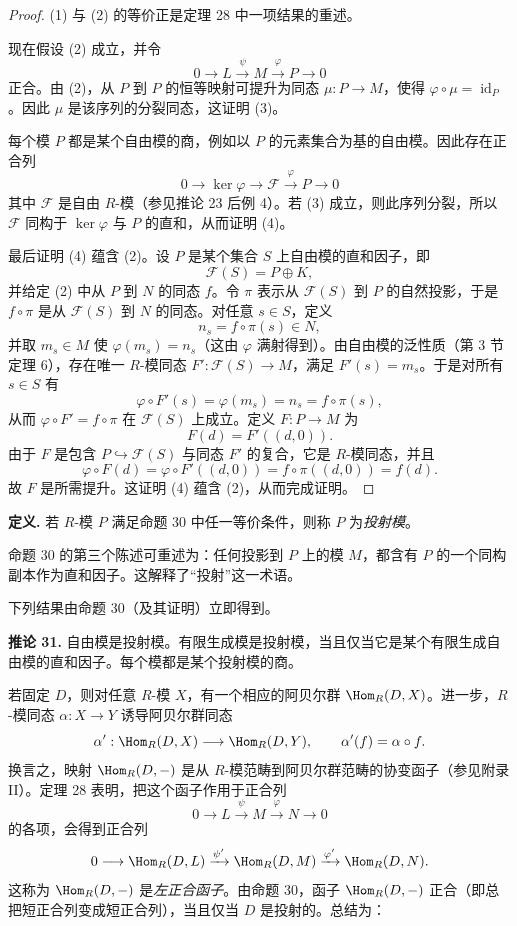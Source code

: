 \begin{proof}
(1) 与 (2) 的等价正是定理 28 中一项结果的重述。

现在假设 (2) 成立，并令
\[
0\longrightarrow L\xrightarrow{\psi}M\xrightarrow{\varphi}P\longrightarrow0
\]
正合。由 (2)，从 $P$ 到 $P$ 的恒等映射可提升为同态 $\mu:P\to M$，使得 $\varphi\circ\mu=\operatorname{id}_P$。因此 $\mu$ 是该序列的分裂同态，这证明 (3)。

每个模 $P$ 都是某个自由模的商，例如以 $P$ 的元素集合为基的自由模。因此存在正合列
\[
0\longrightarrow\ker\varphi\longrightarrow \mathcal F\xrightarrow{\varphi}P\longrightarrow0
\]
其中 $\mathcal F$ 是自由 $R$-模（参见推论 23 后例 4）。若 (3) 成立，则此序列分裂，所以 $\mathcal F$ 同构于 $\ker\varphi$ 与 $P$ 的直和，从而证明 (4)。

最后证明 (4) 蕴含 (2)。设 $P$ 是某个集合 $S$ 上自由模的直和因子，即
\[
\mathcal F(S)=P\oplus K,
\]
并给定 (2) 中从 $P$ 到 $N$ 的同态 $f$。令 $\pi$ 表示从 $\mathcal F(S)$ 到 $P$ 的自然投影，于是 $f\circ\pi$ 是从 $\mathcal F(S)$ 到 $N$ 的同态。对任意 $s\in S$，定义
\[
n_s=f\circ\pi(s)\in N,
\]
并取 $m_s\in M$ 使 $\varphi(m_s)=n_s$（这由 $\varphi$ 满射得到）。由自由模的泛性质（第 3 节定理 6），存在唯一 $R$-模同态 $F':\mathcal F(S)\to M$，满足 $F'(s)=m_s$。于是对所有 $s\in S$ 有
\[
\varphi\circ F'(s)=\varphi(m_s)=n_s=f\circ\pi(s),
\]
从而 $\varphi\circ F'=f\circ\pi$ 在 $\mathcal F(S)$ 上成立。定义 $F:P\to M$ 为
\[
F(d)=F'((d,0)).
\]
由于 $F$ 是包含 $P\hookrightarrow\mathcal F(S)$ 与同态 $F'$ 的复合，它是 $R$-模同态，并且
\[
\varphi\circ F(d)=\varphi\circ F'((d,0))=f\circ\pi((d,0))=f(d).
\]
故 $F$ 是所需提升。这证明 (4) 蕴含 (2)，从而完成证明。
\end{proof}

\noindent\textbf{定义.} 若 $R$-模 $P$ 满足命题 30 中任一等价条件，则称 $P$ 为\emph{投射模}。

命题 30 的第三个陈述可重述为：任何投影到 $P$ 上的模 $M$，都含有 $P$ 的一个同构副本作为直和因子。这解释了“投射”这一术语。

下列结果由命题 30（及其证明）立即得到。

\noindent\textbf{推论 31.} 自由模是投射模。有限生成模是投射模，当且仅当它是某个有限生成自由模的直和因子。每个模都是某个投射模的商。

若固定 $D$，则对任意 $R$-模 $X$，有一个相应的阿贝尔群 $\Hom_R(D,X)$。进一步，$R$-模同态 $\alpha:X\to Y$ 诱导阿贝尔群同态
\[
\alpha':\Hom_R(D,X)\longrightarrow\Hom_R(D,Y),
\qquad \alpha'(f)=\alpha\circ f.
\]
换言之，映射 $\Hom_R(D,-)$ 是从 $R$-模范畴到阿贝尔群范畴的协变函子（参见附录 II）。定理 28 表明，把这个函子作用于正合列
\[
0\longrightarrow L\xrightarrow{\psi}M\xrightarrow{\varphi}N\longrightarrow0
\]
的各项，会得到正合列
\[
0\longrightarrow\Hom_R(D,L)\xrightarrow{\psi'}\Hom_R(D,M)\xrightarrow{\varphi'}\Hom_R(D,N).
\]
这称为 $\Hom_R(D,-)$ 是\emph{左正合函子}。由命题 30，函子 $\Hom_R(D,-)$ 正合（即总把短正合列变成短正合列），当且仅当 $D$ 是投射的。总结为：

